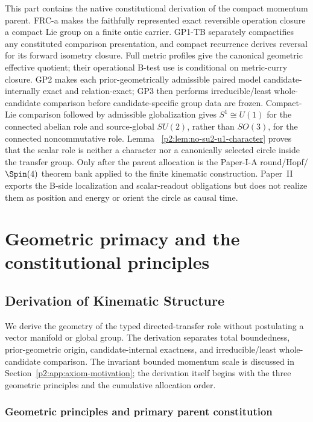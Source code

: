 \documentclass[12pt,a4paper]{article}
\begin{document}
\label{p2:part:kin-core}
\label{p2:part:carrier-constitution}

This part contains the native constitutional derivation of the compact
momentum parent.  FRC-a makes the faithfully represented exact reversible
operation closure a compact Lie group on a finite ontic carrier.  GP1-TB
separately compactifies any constituted comparison presentation, and compact
recurrence derives reversal for its forward isometry closure.  Full metric
profiles give the canonical geometric effective quotient; their operational
B-test use is conditional on metric-curry closure.  GP2 makes each
prior-geometrically admissible paired model candidate-internally exact and
relation-exact; GP3 then performs irreducible/least whole-candidate comparison
before candidate-specific group data are frozen.  Compact-Lie comparison
followed by admissible globalization
gives \(S^1\cong U(1)\) for the connected abelian role and source-global
\(SU(2)\), rather than \(SO(3)\), for the
connected noncommutative role.  Lemma~
\ref{p2:lem:no-su2-u1-character} proves that the scalar role is neither a
character nor a canonically selected circle inside the transfer group.  Only
after the parent allocation is the Paper-I-A round/Hopf/\(\Spin(4)\) theorem
bank applied to the finite kinematic construction.  Paper~II exports the
B-side localization and scalar-readout obligations but does not realize them
as position and energy or orient the circle as causal time.

\section{Geometric primacy and the constitutional principles}
\label{paper2a:sec:organized-principles}

\subsection{Derivation of Kinematic Structure}
\label{p2:sec:derivation}

We derive the geometry of the typed directed-transfer role without
postulating a vector manifold or global group.  The derivation separates total
boundedness, prior-geometric origin, candidate-internal exactness, and
irreducible/least whole-candidate comparison.  The
invariant bounded momentum scale is discussed in
Section~\ref{p2:app:axiom-motivation}; the derivation itself begins with the
three geometric principles and the cumulative allocation order.

\subsubsection{Geometric principles and primary parent constitution}
\label{p2:subsec:constitution-clauses}
\end{document}

